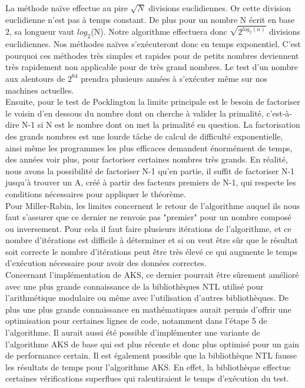 		La méthode naïve effectue au pire $\sqrt{N}$ divisions euclidiennes. Or cette division euclidienne n'est pas à temps constant. De plus pour un nombre N écrit en base 2, sa longueur vaut $log_2$(N). Notre algorithme effectuera donc $\sqrt{2^{log_2(n)}}$ divisions euclidiennes. Nos méthodes naïves s’exécuteront donc en temps exponentiel. C'est pourquoi ces méthodes très simples et rapides pour de petits nombres deviennent très rapidement non applicable pour de très grand nombres. Le test d'un nombre aux alentours de $2^{64}$ prendra plusieurs années à s’exécuter même sur nos machines actuelles.\\
		
		Ensuite, pour le test de Pocklington la limite principale est le besoin de factoriser le voisin d’en dessous du nombre dont on cherche à valider la primalité, c’est-à-dire N-1 si N est le nombre dont on met la primalité en question. La factorisation des grands nombres est une lourde tâche de calcul de difficulté exponentielle, ainsi même les programmes les plus efficaces demandent énormément de temps, des années voir plus, pour factoriser certaines nombres très grands.
En réalité, nous avons la possibilité de factoriser N-1 qu’en partie, il suffit de factoriser N-1 jusqu’à trouver un A, créé à partir des facteurs premiers de N-1, qui respecte les conditions nécessaires pour appliquer le théorème.\\

		Pour Miller-Rabin, les limites concernent le retour de l'algorithme auquel ils nous faut s'assurer que ce dernier ne renvoie pas "premier" pour un nombre composé ou inversement. Pour cela il faut faire plusieurs itérations de l'algorithme, et ce nombre d'itérations est difficile à déterminer et si on veut être sûr que le résultat soit correcte le nombre d'itérations peut être très élevé ce qui augmente le temps d'exécution nécessaire pour avoir des données correctes.\\	
		
		Concernant l'implémentation de AKS, ce dernier pourrait être sûrement amélioré avec une plus grande connaissance de la bibliothèques NTL utilisé pour l'arithmétique modulaire ou même avec l'utilisation d'autres bibliothèques. De plus une plus grande connaissance en mathématiques aurait permis d'offrir une optimisation pour certaines lignes de code, notamment dans l'étape 5 de l’algorithme. Il aurait aussi été possible d'implémenter une variante de l’algorithme AKS de base qui est plus récente et donc plus optimisé pour un gain de performance certain.
Il est également possible que la bibliothèque NTL fausse les résultats de temps pour l'algorithme AKS. En effet, la bibliothèque effectue certaines vérifications superflues qui ralentiraient le temps d’exécution du test.\\
		
